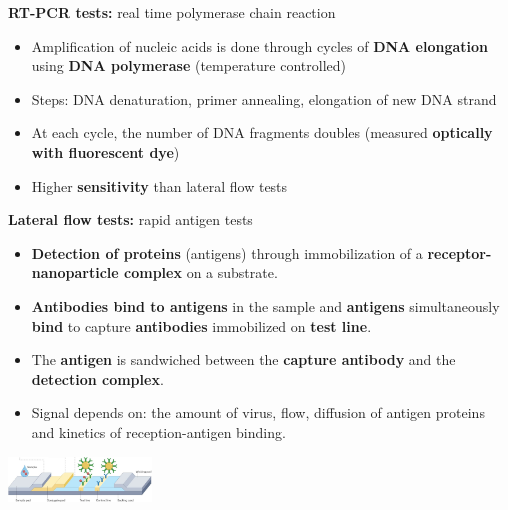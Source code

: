 \textbf{RT-PCR tests:} \hfill real time polymerase chain reaction
\begin{itemize}
    \item Amplification of nucleic acids is done through cycles of \textbf{DNA elongation} using \textbf{DNA polymerase} (temperature controlled)
    \item Steps: DNA denaturation, primer annealing, elongation of new DNA strand
    \item At each cycle, the number of DNA fragments doubles (measured \textbf{optically with fluorescent dye})
    \item Higher \textbf{sensitivity} than lateral flow tests
\end{itemize}

\textbf{Lateral flow tests:} \hfill rapid antigen tests
\begin{itemize}
    \item \textbf{Detection of proteins} (antigens) through
immobilization of a \textbf{receptor-nanoparticle
complex} on a substrate.
    \item \textbf{Antibodies bind to antigens} in the sample and
\textbf{antigens} simultaneously \textbf{bind} to capture \textbf{antibodies} immobilized on \textbf{test line}.
    \item The \textbf{antigen} is sandwiched between the \textbf{capture antibody} and the \textbf{detection complex}.
    \item Signal depends on: the amount of virus, flow,
diffusion of antigen proteins and kinetics of
reception-antigen binding.
\end{itemize}
\includegraphics[width=38mm]{src/Images/antigen_test.png}
